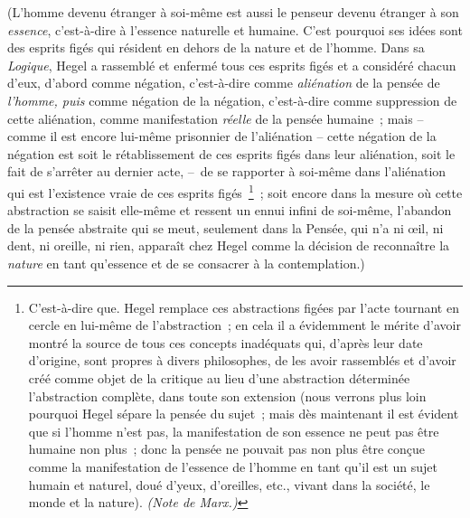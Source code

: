 \documentclass[french,twoside]{book} %
\begin{document}
(L’homme devenu étranger à soi-même est aussi le penseur devenu étranger à son \emph{essence}, c’est-à-dire à l’essence naturelle et humaine. C’est pourquoi ses idées sont des esprits figés qui résident en dehors de la nature et de l’homme. Dans sa \emph{Logique}, Hegel a rassemblé et enfermé tous ces esprits figés et a considéré chacun d’eux, d’abord comme négation, c’est-à-dire comme \emph{aliénation} de la pensée de \emph{l’homme, puis} comme négation de la négation, c’est-à-dire comme suppression de cette aliénation, comme manifestation \emph{réelle} de la pensée humaine ; mais – comme il est encore lui-même prisonnier de l’aliénation – cette négation de la négation est soit le rétablissement de ces esprits figés dans leur aliénation, soit le fait de s’arrêter au dernier acte, – de se rapporter à soi-même dans l’aliénation qui est l’existence vraie de ces esprits figés \footnote{C’est-à-dire que. Hegel remplace ces abstractions figées par l’acte tournant en cercle en lui-même de l’abstraction ; en cela il a évidemment le mérite d’avoir montré la source de tous ces concepts inadéquats qui, d’après leur date d’origine, sont propres à divers philosophes, de les avoir rassemblés et d’avoir créé comme objet de la critique au lieu d’une abstraction déterminée l’abstraction complète, dans toute son extension (nous verrons plus loin pourquoi Hegel sépare la pensée du sujet ; mais dès maintenant il est évident que si l’homme n’est pas, la manifestation de son essence ne peut pas être humaine non plus ; donc la pensée ne pouvait pas non plus être conçue comme la manifestation de l’essence de l’homme en tant qu’il est un sujet humain et naturel, doué d’yeux, d’oreilles, etc., vivant dans la société, le monde et la nature). \emph{(Note de Marx.)}} ; soit encore dans la mesure où cette abstraction se saisit elle-même et ressent un ennui infini de soi-même, l’abandon de la pensée abstraite qui se meut, seulement dans la Pensée, qui n’a ni œil, ni dent, ni oreille, ni rien, apparaît chez Hegel comme la décision de reconnaître la \emph{nature} en tant qu’essence et de se consacrer à la contemplation.)\par
\end{document}
